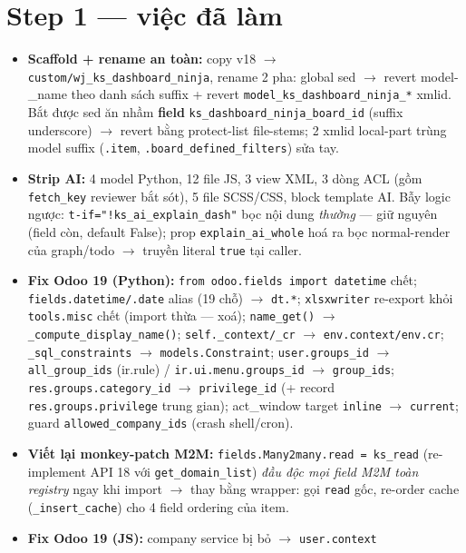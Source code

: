\section{Step 1 --- việc đã làm}

\begin{itemize}
  \item \textbf{Scaffold + rename an toàn:} copy v18 $\to$ \texttt{custom/wj\_ks\_dashboard\_ninja},
    rename 2 pha: global sed $\to$ revert model-\_name theo danh sách suffix + revert
    \texttt{model\_ks\_dashboard\_ninja\_*} xmlid. Bắt được sed ăn nhầm \textbf{field}
    \texttt{ks\_dashboard\_ninja\_board\_id} (suffix underscore) $\to$ revert bằng protect-list
    file-stems; 2 xmlid local-part trùng model suffix (\texttt{.item},
    \texttt{.board\_defined\_filters}) sửa tay.
  \item \textbf{Strip AI:} 4 model Python, 12 file JS, 3 view XML, 3 dòng ACL (gồm
    \texttt{fetch\_key} reviewer bắt sót), 5 file SCSS/CSS, block template AI. Bẫy logic
    ngược: \texttt{t-if="!ks\_ai\_explain\_dash"} bọc nội dung \emph{thường} --- giữ nguyên
    (field còn, default False); prop \texttt{explain\_ai\_whole} hoá ra bọc normal-render
    của graph/todo $\to$ truyền literal \texttt{true} tại caller.
  \item \textbf{Fix Odoo 19 (Python):} \texttt{from odoo.fields import datetime} chết;
    \texttt{fields.datetime/.date} alias (19 chỗ) $\to$ \texttt{dt.*}; \texttt{xlsxwriter}
    re-export khỏi \texttt{tools.misc} chết (import thừa --- xoá); \texttt{name\_get()}
    $\to$ \texttt{\_compute\_display\_name()}; \texttt{self.\_context/\_cr} $\to$
    \texttt{env.context/env.cr}; \texttt{\_sql\_constraints} $\to$ \texttt{models.Constraint};
    \texttt{user.groups\_id} $\to$ \texttt{all\_group\_ids} (ir.rule) /
    \texttt{ir.ui.menu.groups\_id} $\to$ \texttt{group\_ids};
    \texttt{res.groups.category\_id} $\to$ \texttt{privilege\_id} (+ record
    \texttt{res.groups.privilege} trung gian); act\_window target \texttt{inline} $\to$
    \texttt{current}; guard \texttt{allowed\_company\_ids} (crash shell/cron).
  \item \textbf{Viết lại monkey-patch M2M:} \texttt{fields.Many2many.read = ks\_read}
    (re-implement API 18 với \texttt{get\_domain\_list}) \emph{đầu độc mọi field M2M toàn
    registry} ngay khi import $\to$ thay bằng wrapper: gọi \texttt{read} gốc, re-order
    cache (\texttt{\_insert\_cache}) cho 4 field ordering của item.
  \item \textbf{Fix Odoo 19 (JS):} company service bị bỏ $\to$ \texttt{user.context}

\end{itemize}
